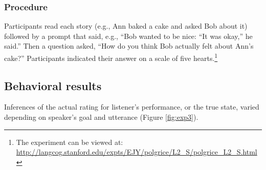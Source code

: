 \documentclass[10pt,letterpaper]{article}
\begin{document}
\subsubsection{Procedure}
Participants read each story (e.g., Ann baked a cake and asked Bob about it) followed by a prompt that said,
e.g., ``Bob wanted to be nice: ``It was okay,'' he said.''
Then a question asked, ``How do you think Bob actually felt about Ann's cake?''
Participants indicated their answer on a scale of five hearts.\footnote{The experiment can be viewed at: \url{http://langcog.stanford.edu/expts/EJY/polgrice/L2_S/polgrice_L2_S.html}}

\subsection{Behavioral results}


Inferences of the actual rating for listener's performance, or the true state, varied depending on speaker's goal and utterance (Figure \ref{fig:exp3}).

\end{document}
